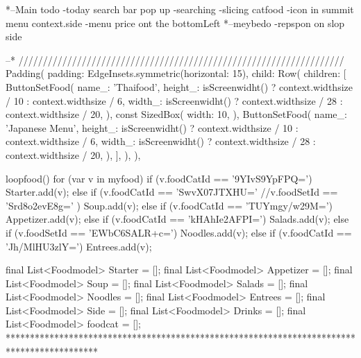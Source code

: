*--Main todo 
-today  search bar pop up 
-searching
-slicing catfood 
-icon in summit menu context.side
-menu price ont the bottomLeft
*--meybedo
-repspon on slop side


--*
///////////////////////////////////////////////////////////////////
Padding(
                      padding: EdgeInsets.symmetric(horizontal: 15),
                      child: Row(
                        children: [
                          ButtonSetFood(
                            name_: 'Thaifood',
                            height_: isScreenwidht()
                                ? context.widthsize / 10
                                : context.widthsize / 6,
                            width_: isScreenwidht()
                                ? context.widthsize / 28
                                : context.widthsize / 20,
                          ),
                          const SizedBox(
                            width: 10,
                          ),
                          ButtonSetFood(
                            name_: 'Japanese Menu',
                            height_: isScreenwidht()
                                ? context.widthsize / 10
                                : context.widthsize / 6,
                            width_: isScreenwidht()
                                ? context.widthsize / 28
                                : context.widthsize / 20,
                          ),
                        ],
                      ),
                    ),

                    loopfood() {
                        for (var v in myfood) {
                          if (v.foodCatId == '9YIvS9YpFPQ=') {
                            Starter.add(v);
                          } else if (v.foodCatId == 'SwvX07JTXHU=' //v.foodSetId == 'Srd8o2evE8g='
                              ) {
                            Soup.add(v);
                          } else if (v.foodCatId == 'TUYmgy/w29M=') {
                            Appetizer.add(v);
                          } else if (v.foodCatId == 'kHAhIe2AFPI=') {
                            Salads.add(v);
                          } else if (v.foodSetId == 'EWbC6SALR+c=') {
                            Noodles.add(v);
                          } else if (v.foodCatId == 'Jh/MlHU3zlY=') {
                            Entrees.add(v);
                          }
                        }
                      }

                      final List<Foodmodel> Starter = [];
                      final List<Foodmodel> Appetizer = [];
                      final List<Foodmodel> Soup = [];
                      final List<Foodmodel> Salads = [];
                      final List<Foodmodel> Noodles = [];
                      final List<Foodmodel> Entrees = [];
                      final List<Foodmodel> Side = [];
                      final List<Foodmodel> Drinks = [];
                      final List<Foodmodel> foodcat = [];
*******************************************************************************************

